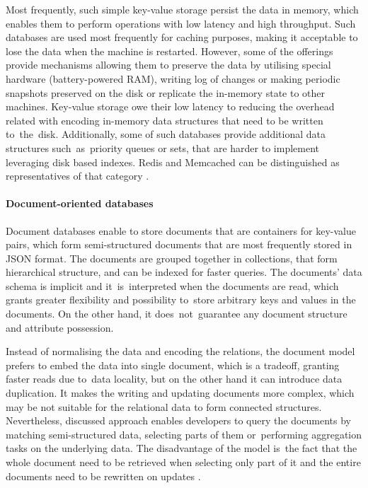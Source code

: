 Most frequently, such simple key-value storage persist the data in memory, which enables them to perform operations with low latency and high throughput. Such databases are used most frequently for caching purposes, making it acceptable to lose the data when the machine is restarted. However, some of the offerings provide mechanisms allowing them to preserve the data by utilising special hardware (battery-powered RAM), writing log of changes or making periodic snapshots preserved on the disk or replicate the in-memory state to other machines. Key-value storage owe their low latency to reducing the overhead related with encoding in-memory data structures that need to be written to~the~disk. Additionally, some of such databases provide additional data structures such~as~priority queues or sets, that are harder to implement leveraging disk based indexes. Redis \cite{Redis} and Memcached \cite{Memcached} can be distinguished as representatives of that category \cite{DesignDataIntensiveApplications}. 

\paragraph{Document-oriented databases}

Document databases enable to store documents that are containers for key-value pairs, which form semi-structured documents that are most frequently stored in JSON format. The documents are grouped together in collections, that form hierarchical structure, and can be indexed for faster queries. The documents' data schema is implicit and it~is~interpreted when the documents are read, which grants greater flexibility and possibility to~store arbitrary keys and values in the documents. On the other hand, it does~not~guarantee any document structure and attribute possession.

Instead of normalising the data and encoding the relations, the document model prefers to embed the data into single document, which is a tradeoff, granting faster reads due to~data locality, but on the other hand it can introduce data duplication. It makes the writing and updating documents more complex, which may be not suitable for the relational data to form connected structures. Nevertheless, discussed approach enables developers to query the documents by matching semi-structured data, selecting parts of them or~performing aggregation tasks on the underlying data. 
The disadvantage of the model is~the fact that the whole document need to be retrieved when selecting only part of it and the entire documents need to be rewritten on updates \cite{DesignDataIntensiveApplications}.

